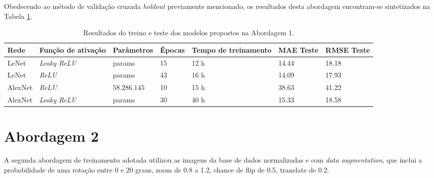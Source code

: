 
	Obedecendo ao método de validação cruzada \emph{holdout} previamente mencionado, os resultados desta abordagem encontram-se sintetizados na Tabela \ref{tab:results-2}.

	\begin{table}[!ht]
		\caption{Resultados do treino e teste dos modelos propostos na Abordagem 1.}
		\label{tab:results-2}
		\begin{adjustbox}{width=1\textwidth}
			\begin{tabular}{l l l l l l l}
				\toprule
				Rede & Função de ativação & Parâmetros & Épocas & Tempo de treinamento & MAE Teste & RMSE Teste \\
				\midrule
				LeNet & \emph{Leaky ReLU} & params & 15 & 12 h & 14.44 & 18.18 \\
				LeNet & \emph{ReLU} & params & 43 & 16 h & 14.09 & 17.93 \\
				AlexNet & \emph{ReLU} & $58.286.145$ & 10 & 15 h & 38.63 & 41.22 \\
				AlexNet & \emph{Leaky ReLU} & params & 30 & 40 h & 15.33 & 18.58 \\
				\bottomrule
			\end{tabular}
		\end{adjustbox}
	\end{table}

\section{Abordagem 2}%
	A segunda abordagem de treinamento adotada utilizou as imagens da base de dados normalizadas e com \emph{data augmentation}, que inclui a probabilidade de uma rotação entre 0 e 20 graus, zoom de 0.8 a 1.2, chance de flip de 0.5, translate de 0.2.

